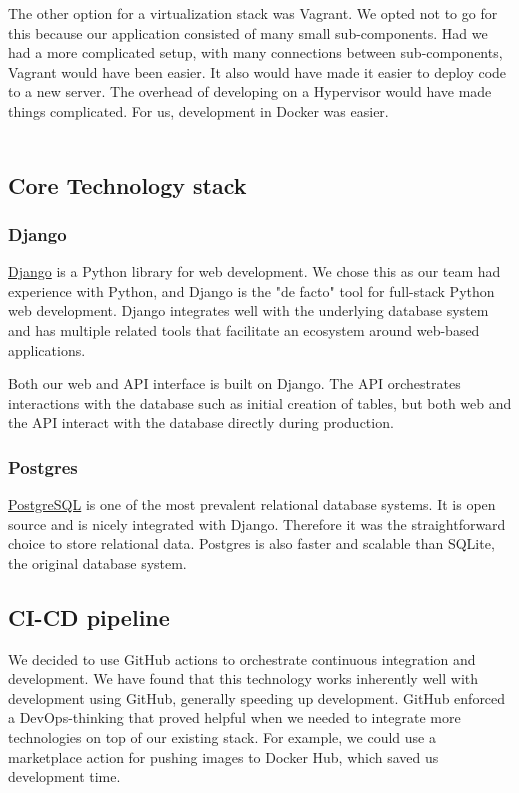 \documentclass[11pt]{article}
\begin{document}
The other option for a virtualization stack was Vagrant. We opted not to go for this because our application consisted of many small sub-components. Had we had a more complicated setup, with many connections between sub-components, Vagrant would have been easier. It also would have made it easier to deploy code to a new server. The overhead of developing on a Hypervisor would have made things complicated. For us, development in Docker was easier. 
\ \\ \\

\subsection{Core Technology stack}

\subsubsection{Django}
\href{https://www.Djangoproject.com/}{Django} is a Python library for web development. We chose this as our team had experience with Python, and Django is the "de facto" tool for full-stack Python web development. Django integrates well with the underlying database system and has multiple related tools that facilitate an ecosystem around web-based applications. 

Both our web and API interface is built on Django. The API orchestrates interactions with the database such as initial creation of tables, but both web and the API interact with the database directly during production.

\subsubsection{Postgres}
\href{https://www.postgresql.org/}{PostgreSQL} is one of the most prevalent relational database systems. It is open source and is nicely integrated with Django. Therefore it was the straightforward choice to store relational data. Postgres is also faster and scalable than SQLite, the original database system.


\subsection{CI-CD pipeline}
We decided to use GitHub actions to orchestrate continuous integration and development. We have found that this technology works inherently well with development using GitHub, generally speeding up development. GitHub enforced a DevOps-thinking that proved helpful when we needed to integrate more technologies on top of our existing stack. For example, we could use a marketplace action for pushing images to Docker Hub, which saved us development time.
\end{document}
